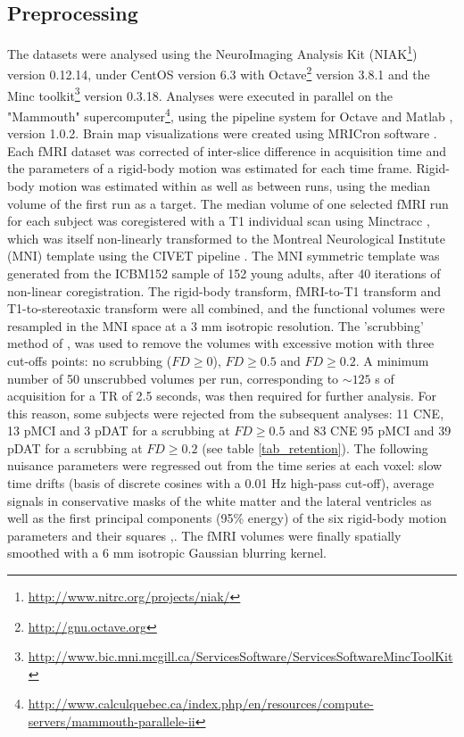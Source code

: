 \subsection{Preprocessing}
The datasets were analysed using the NeuroImaging Analysis Kit (NIAK\footnote{\url{http://www.nitrc.org/projects/niak/}}) version 0.12.14, under CentOS version 6.3 with Octave\footnote{\url{http://gnu.octave.org}} version 3.8.1 and the Minc toolkit\footnote{\url{http://www.bic.mni.mcgill.ca/ServicesSoftware/ServicesSoftwareMincToolKit}} version 0.3.18. Analyses were executed in parallel on the "Mammouth" supercomputer\footnote{\url{http://www.calculquebec.ca/index.php/en/resources/compute-servers/mammouth-parallele-ii}}, using the pipeline system for Octave and Matlab \citep{Bellec2012}, version 1.0.2. Brain map visualizations were created using MRICron software \citep{Rorden2007}. Each fMRI dataset was corrected of inter-slice difference in acquisition time and the parameters of a rigid-body motion was estimated for each time frame. Rigid-body motion was estimated within as well as between runs, using the median volume of the first run as a target. The median volume of one selected fMRI run for each subject 
was coregistered with a T1 individual scan using Minctracc \citep{Collins1998}, which was itself non-linearly transformed to the Montreal Neurological Institute (MNI) template \citep{Fonov2011} using the CIVET pipeline \citep{Zijdenbos2002}. The MNI symmetric template was generated from the ICBM152 sample of 152 young adults, after 40 iterations of non-linear coregistration. The rigid-body transform, fMRI-to-T1 transform and T1-to-stereotaxic transform were all combined, and the functional volumes were resampled in the MNI space at a 3 mm isotropic resolution. The 'scrubbing' method of \citep{Power2012}, was used to remove the volumes with excessive motion with three cut-offs points: no scrubbing ($FD\geq0$), $FD\geq0.5$ and $FD\geq0.2$. A minimum number of 50 unscrubbed volumes per run, corresponding to $\sim 125$ s of acquisition for a TR of 2.5 seconds, was then required for further analysis. For this reason, some subjects were rejected from the subsequent analyses: 11 CNE, 13 pMCI 
and 3 pDAT for a scrubbing at $FD\geq0.5$ and 83 CNE 95 pMCI and 39 pDAT for a scrubbing at $FD\geq0.2$ (see table \ref{tab_retention}). The following nuisance parameters were regressed out from the time series at each voxel: slow time drifts (basis of discrete cosines with a 0.01 Hz high-pass cut-off), average signals in conservative masks of the white matter and the lateral ventricles as well as the first principal components (95\% energy) of the six rigid-body motion parameters and their squares \citep{Lund2006},\citep{Giove2009}. The fMRI volumes were finally spatially smoothed with a 6 mm isotropic Gaussian blurring kernel. 

